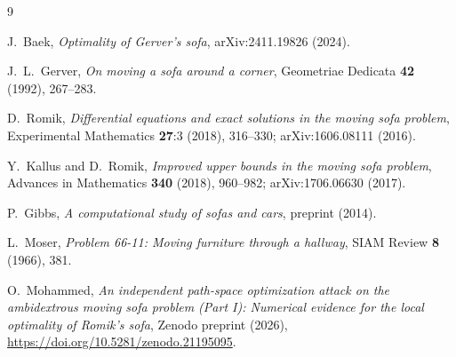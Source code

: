 \documentclass[11pt]{article}
\begin{document}
\begin{thebibliography}{9}

J.~Baek, \emph{Optimality of Gerver's sofa}, arXiv:2411.19826 (2024).

J.~L.~Gerver, \emph{On moving a sofa around a corner}, Geometriae Dedicata \textbf{42} (1992), 267--283.

D.~Romik, \emph{Differential equations and exact solutions in the moving sofa problem}, Experimental Mathematics \textbf{27}:3 (2018), 316--330; arXiv:1606.08111 (2016).

Y.~Kallus and D.~Romik, \emph{Improved upper bounds in the moving sofa problem}, Advances in Mathematics \textbf{340} (2018), 960--982; arXiv:1706.06630 (2017).

P.~Gibbs, \emph{A computational study of sofas and cars}, preprint (2014).

L.~Moser, \emph{Problem 66-11: Moving furniture through a hallway}, SIAM Review \textbf{8} (1966), 381.

O.~Mohammed, \emph{An independent path-space optimization attack on the ambidextrous moving sofa problem (Part I): Numerical evidence for the local optimality of Romik's sofa}, Zenodo preprint (2026), \url{https://doi.org/10.5281/zenodo.21195095}.

\end{thebibliography}
\end{document}
